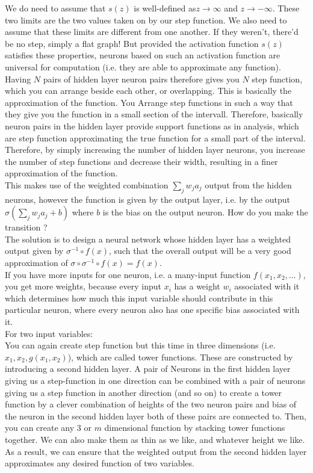 We do need to assume that $s(z)$ is well-defined as$z\rightarrow \infty$ and $z\rightarrow -\infty$. These two limits are the two values taken on by our step function. We also need to assume that these limits are different from one another. If they weren't, there'd be no step, simply a flat graph! But provided the activation function $s(z)$ satisfies these properties, neurons based on such an activation function are universal for computation (i.e. they are able to approximate any function).
\\
 Having $N$ pairs of hidden layer neuron pairs therefore gives you $N$ step function, which you can arrange beside each other, or overlapping. This is basically the approximation of the function. You Arrange step functions in such a way that they give you the function in a small section of the intervall. Therefore, basically neuron pairs in the hidden layer provide support functions as in analysis, which are step function approximating the true function for a small part of the interval. Therefore, by simply increasing the number of hidden layer neurons, you increase the number of step functions and decrease their width, resulting in a finer approximation of the function.\\
This makes use of the weighted combination $\sum_j w_j a_j$ output from the hidden neurons, however the function is given by the output layer, i.e. by the output $\sigma(\sum_j w_j a_j +b)$ where $b$ is the bias on the output neuron. How do you make the transition ?\\
The solution is to design a neural network whose hidden layer has a weighted output given by $\sigma^{-1}\circ f(x)$, such that the overall output will be a very good approximation of $\sigma\circ \sigma^{-1} \circ f(x) = f(x)$.
\\
If you have more inputs for one neuron, i.e. a many-input function $f(x_1,x_2,\dots)$, you get more weights, because every input $x_i$ has a weight $w_i$ associated with it which determines how much this input variable should contribute in this particular neuron, where every neuron also has one specific bias associated with it.\\
For two input variables:\\
 You can again create step function but this time in three dimensions (i.e. $x_1,x_2,g(x_1,x_2)$), which are called tower functions. These are constructed by introducing a second hidden layer. A pair of Neurons in the first hidden layer giving us a step-function in one direction can be combined with a pair of neurons giving us a step function in another direction (and so on) to create a tower function by a clever combination of heights of the two neuron pairs and bias of the neuron in the second hidden layer both of these pairs are connected to. Then, you can create any $3$ or $m$ dimensional function by stacking tower functions together. We can also make them as thin as we like, and whatever height we like. As a result, we can ensure that the weighted output from the second hidden layer approximates any desired function of two variables.
